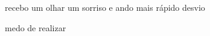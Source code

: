 \begin{poem}
\begin{stanza}
recebo\verseline
\qquad um olhar\verseline
\qquad um sorriso\verseline
e ando mais rápido\verseline
\qquad desvio
\end{stanza}
\begin{stanza}
medo\verseline
\qquad de realizar
\end{stanza}
\end{poem}